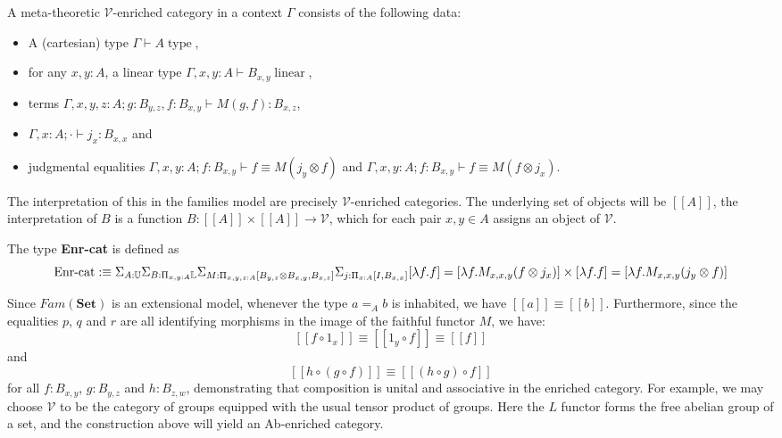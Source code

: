 \documentclass[a4paper,english]{lipics-v2018}
\DeclareMathOperator{\type}{\text{ type}}
\DeclareMathOperator{\linear}{\text{ linear}}
\begin{document}
\begin{definition}
  A meta-theoretic $\mathcal{V}$-enriched category in a context $\Gamma$ consists of the following data:
 \begin{itemize}
\item A (cartesian) type $\Gamma \vdash A \type$,
\item for any $x, y : A$, a linear type $\Gamma, x, y : A \vdash B_{x, y} \linear$,
\item terms $\Gamma, x, y, z : A; g: B_{y, z}, f:  B_{x, y} \vdash M(g, f) : B_{x, z}$,
\item $\Gamma, x : A; \cdot \vdash j_x : B_{x, x}$ and
\item judgmental equalities $\Gamma, x, y : A; f : B_{x, y} \vdash f \equiv M(j_y \otimes f)$ and $\Gamma, x, y : A; f : B_{x, y} \vdash f \equiv M(f \otimes j_x)$.
\end{itemize}
\end{definition}
The interpretation of this in the families model are precisely $\mathcal{V}$-enriched categories. The underlying set of objects will be $[[A]]$, the interpretation of $B$ is a function $B : [[A]] \times [[A]] \to \mathcal{V}$, which for each pair $x, y \in A$ assigns an object of $\mathcal{V}$. 
\begin{definition}
  The type \textbf{Enr-cat} is defined as
  \footnotesize
  \[
\text{Enr-cat} :\equiv \Sigma_{A : \mathbb{U}} \Sigma_{B : \Pi_{x, y : A}\mathbb{L}} \Sigma_{M : \Pi_{x, y, z : A} [B_{y, z} \otimes B_{x, y}, B_{x,z}]} \Sigma_{j : \Pi_{x: A}[I, B_{x, x}]}[\lambda f. f] = [\lambda f. M_{x, x, y}(f \otimes j_x)] \times [\lambda f. f] = [\lambda f. M_{x, x, y}(j_y \otimes f)] \\
  \]
  \normalsize
\end{definition}
Since $Fam(\mathbf{Set})$ is an extensional model, whenever the type $a =_A b$ is inhabited, we have $[[a]]\equiv[[b]]$. Furthermore, since the equalities $p$, $q$ and $r$ are all identifying morphisms in the image of the faithful functor $M$, we have:
\[
[[f \circ 1_x ]] \equiv [[1_y \circ f]] \equiv [[f]]
\]
and
\[
[[h \circ (g \circ f)]] \equiv [[(h \circ g) \circ f]]
\]
for all $f : B_{x,y}$, $g : B_{y,z}$ and $h : B_{z,w}$, demonstrating that composition is unital and associative in the enriched category.
For example, we may choose $\mathcal{V}$ to be the category of groups equipped with the usual tensor product of groups. Here the $L$ functor forms the free abelian group of a set, and the construction above will yield an Ab-enriched category.
\end{document}
